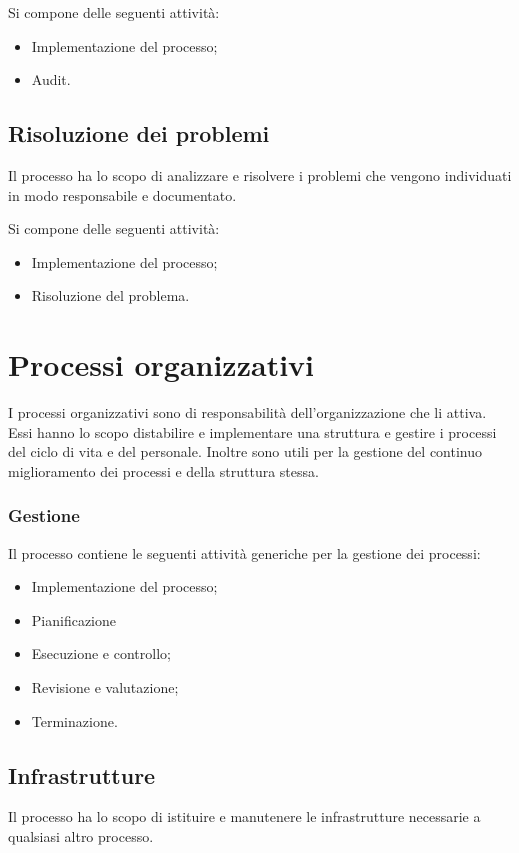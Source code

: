Si compone delle seguenti attività:
\begin{itemize}
    \item Implementazione del processo;
    \item Audit.
\end{itemize}

\subsection{Risoluzione dei problemi}

Il processo ha lo scopo di analizzare e risolvere i problemi che vengono individuati in modo responsabile e documentato.

Si compone delle seguenti attività:
\begin{itemize}
    \item Implementazione del processo;
    \item Risoluzione del problema.
\end{itemize}

\section{Processi organizzativi}

I processi organizzativi sono di responsabilità dell'organizzazione che li attiva. Essi hanno lo scopo distabilire e implementare una struttura e gestire i processi del ciclo di vita e del personale. Inoltre sono utili per la gestione del continuo miglioramento dei processi e della struttura stessa.

\subsubsection{Gestione}

Il processo contiene le seguenti attività generiche per la gestione dei processi:

\begin{itemize}
    \item Implementazione del processo;
    \item Pianificazione
    \item Esecuzione e controllo;
    \item Revisione e valutazione;
    \item Terminazione.
\end{itemize}

\subsection{Infrastrutture}
Il processo ha lo scopo di istituire e manutenere le infrastrutture necessarie a qualsiasi altro processo.

